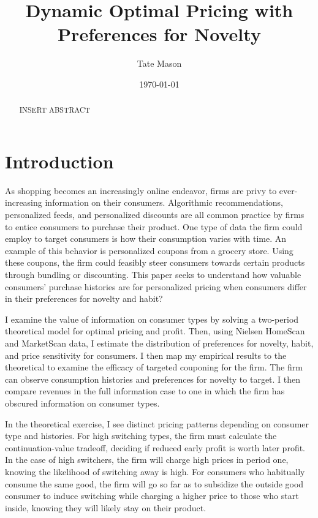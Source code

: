 \documentclass[12pt]{article}
\title{Dynamic Optimal Pricing with Preferences for Novelty}
\author{Tate Mason}
\date{\today}
\theoremstyle{definition}
\theoremstyle{remark}
\begin{document}
\maketitle

\begin{abstract}
  INSERT ABSTRACT
\end{abstract}

\newpage


\section{Introduction}
\label{sec:introduction}

As shopping becomes an increasingly online endeavor, firms are privy to ever-increasing information on their consumers. Algorithmic recommendations, personalized feeds, and personalized discounts are all common practice by firms to entice consumers to purchase their product. One type of data the firm could employ to target consumers is how their consumption varies with time. An example of this behavior is personalized coupons from a grocery store. Using these coupons, the firm could feasibly steer consumers towards certain products through bundling or discounting. This paper seeks to understand how valuable consumers' purchase histories are for personalized pricing when consumers differ in their preferences for novelty and habit?

I examine the value of information on consumer types by solving a two-period theoretical model for optimal pricing and profit. Then, using Nielsen HomeScan and MarketScan data, I estimate the distribution of preferences for novelty, habit, and price sensitivity for consumers. I then map my empirical results to the theoretical to examine the efficacy of targeted couponing for the firm. The firm can observe consumption histories and preferences for novelty to target. I then compare revenues in the full information case to one in which the firm has obscured information on consumer types.

In the theoretical exercise, I see distinct pricing patterns depending on consumer type and histories. For high switching types, the firm must calculate the continuation-value tradeoff, deciding if reduced early profit is worth later profit. In the case of high switchers, the firm will charge high prices in period one, knowing the likelihood of switching away is high. For consumers who habitually consume the same good, the firm will go so far as to subsidize the outside good consumer to induce switching while charging a higher price to those who start inside, knowing they will likely stay on their product. 
\end{document}
